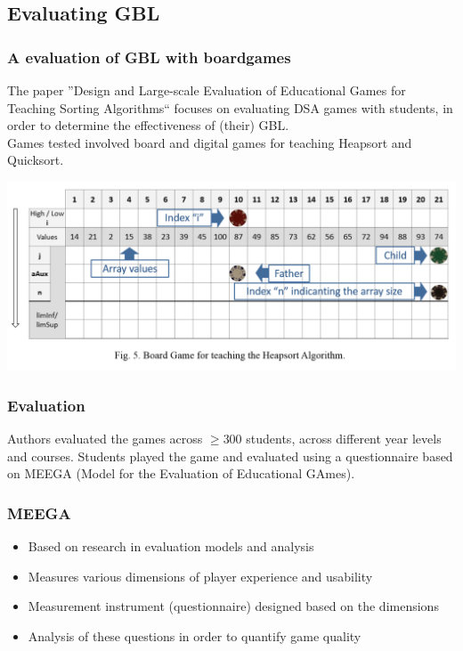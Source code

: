 \documentclass{beamer}
\begin{document}
\subsection{Evaluating GBL}
\begin{frame}
  \frametitle{A evaluation of GBL with boardgames}
  The paper ''Design and Large-scale Evaluation of Educational Games for Teaching Sorting Algorithms`` focuses on evaluating DSA games with students, in order to determine the effectiveness of (their) GBL.\\
  \pause
  Games tested involved board and digital games for teaching Heapsort and Quicksort.
\end{frame}
\begin{frame}
  \begin{center}
    \includegraphics[width=\textwidth,height=\textheight,keepaspectratio]{boardgame.png}
  \end{center}
\end{frame}
\begin{frame}
  \frametitle{Evaluation}
  Authors evaluated the games across $\geq 300$ students, across different year levels and courses. Students played the game and evaluated using a questionnaire based on MEEGA (Model for the Evaluation of Educational GAmes).
\end{frame}
\begin{frame}
  \frametitle{MEEGA}
  \begin{itemize}
    \item Based on research in evaluation models and analysis
    \item Measures various dimensions of player experience and usability
    \item Measurement instrument (questionnaire) designed based on the dimensions
    \item Analysis of these questions in order to quantify game quality
  \end{itemize}
\end{frame}
\end{document}

